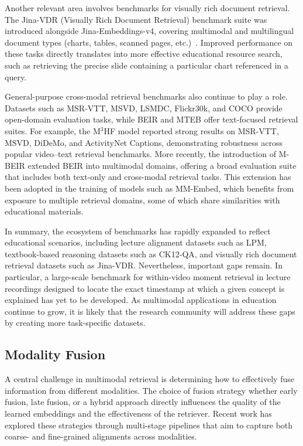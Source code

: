 Another relevant area involves benchmarks for visually rich document retrieval. The Jina-VDR (Visually Rich Document Retrieval) benchmark suite was introduced alongside Jina-Embeddings-v4, covering multimodal and multilingual document types (charts, tables, scanned pages, etc.)~\cite{guenther2025jinaembeddingsv4}. Improved performance on these tasks directly translates into more effective educational resource search, such as retrieving the precise slide containing a particular chart referenced in a query.

General-purpose cross-modal retrieval benchmarks also continue to play a role. Datasets such as MSR-VTT, MSVD, LSMDC, Flickr30k, and COCO provide open-domain evaluation tasks, while BEIR and MTEB offer text-focused retrieval suites. For example, the M\(^3\)HF model reported strong results on MSR-VTT, MSVD, DiDeMo, and ActivityNet Captions, demonstrating robustness across popular video–text retrieval benchmarks. More recently, the introduction of M-BEIR extended BEIR into multimodal domains, offering a broad evaluation suite that includes both text-only and cross-modal retrieval tasks. This extension has been adopted in the training of models such as MM-Embed, which benefits from exposure to multiple retrieval domains, some of which share similarities with educational materials.

In summary, the ecosystem of benchmarks has rapidly expanded to reflect educational scenarios, including lecture alignment datasets such as LPM, textbook-based reasoning datasets such as CK12-QA, and visually rich document retrieval datasets such as Jina-VDR. Nevertheless, important gaps remain. In particular, a large-scale benchmark for within-video moment retrieval in lecture recordings designed to locate the exact timestamp at which a given concept is explained has yet to be developed. As multimodal applications in education continue to grow, it is likely that the research community will address these gaps by creating more task-specific datasets.

\subsection{Modality Fusion}
  
A central challenge in multimodal retrieval is determining how to effectively fuse information from different modalities. The choice of fusion strategy whether early fusion, late fusion, or a hybrid approach directly influences the quality of the learned embeddings and the effectiveness of the retriever. Recent work has explored these strategies through multi-stage pipelines that aim to capture both coarse- and fine-grained alignments across modalities.

